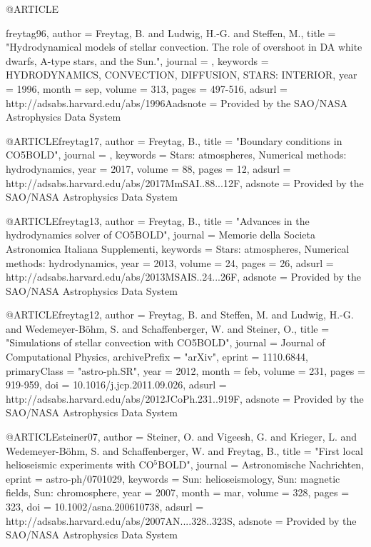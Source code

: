\documentclass[a4paper,fleqn,usenatbib]{mnras}
\begin{document}
@ARTICLE{freytag96,
   author = {{Freytag}, B. and {Ludwig}, H.-G. and {Steffen}, M.},
    title = "{Hydrodynamical models of stellar convection. The role of overshoot in DA white dwarfs, A-type stars, and the Sun.}",
  journal = {\aap},
 keywords = {HYDRODYNAMICS, CONVECTION, DIFFUSION, STARS: INTERIOR},
     year = 1996,
    month = sep,
   volume = 313,
    pages = {497-516},
   adsurl = {http://adsabs.harvard.edu/abs/1996Aadsnote = {Provided by the SAO/NASA Astrophysics Data System}
}



@ARTICLE{freytag17,
   author = {{Freytag}, B.},
    title = "{Boundary conditions in CO5BOLD}",
  journal = {\memsai},
 keywords = {Stars: atmospheres, Numerical methods: hydrodynamics},
     year = 2017,
   volume = 88,
    pages = {12},
   adsurl = {http://adsabs.harvard.edu/abs/2017MmSAI..88...12F},
  adsnote = {Provided by the SAO/NASA Astrophysics Data System}
}

@ARTICLE{freytag13,
   author = {{Freytag}, B.},
    title = "{Advances in the hydrodynamics solver of CO5BOLD}",
  journal = {Memorie della Societa Astronomica Italiana Supplementi},
 keywords = {Stars: atmospheres, Numerical methods: hydrodynamics},
     year = 2013,
   volume = 24,
    pages = {26},
   adsurl = {http://adsabs.harvard.edu/abs/2013MSAIS..24...26F},
  adsnote = {Provided by the SAO/NASA Astrophysics Data System}
}

@ARTICLE{freytag12,
   author = {{Freytag}, B. and {Steffen}, M. and {Ludwig}, H.-G. and {Wedemeyer-B{\"o}hm}, S. and 
	{Schaffenberger}, W. and {Steiner}, O.},
    title = "{Simulations of stellar convection with CO5BOLD}",
  journal = {Journal of Computational Physics},
archivePrefix = "arXiv",
   eprint = {1110.6844},
 primaryClass = "astro-ph.SR",
     year = 2012,
    month = feb,
   volume = 231,
    pages = {919-959},
      doi = {10.1016/j.jcp.2011.09.026},
   adsurl = {http://adsabs.harvard.edu/abs/2012JCoPh.231..919F},
  adsnote = {Provided by the SAO/NASA Astrophysics Data System}
}

@ARTICLE{steiner07,
   author = {{Steiner}, O. and {Vigeesh}, G. and {Krieger}, L. and {Wedemeyer-B{\"o}hm}, S. and 
	{Schaffenberger}, W. and {Freytag}, B.},
    title = "{First local helioseismic experiments with CO$^{5}$BOLD}",
  journal = {Astronomische Nachrichten},
   eprint = {astro-ph/0701029},
 keywords = {Sun: helioseismology, Sun: magnetic fields, Sun: chromosphere},
     year = 2007,
    month = mar,
   volume = 328,
    pages = {323},
      doi = {10.1002/asna.200610738},
   adsurl = {http://adsabs.harvard.edu/abs/2007AN....328..323S},
  adsnote = {Provided by the SAO/NASA Astrophysics Data System}
}


}
\end{document}
